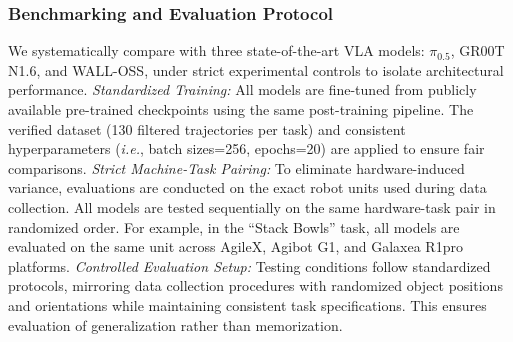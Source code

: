 \subsubsection{Benchmarking and Evaluation Protocol}
We systematically compare \method with three state-of-the-art VLA models: $\pi_{0.5}$, GR00T N1.6, and WALL-OSS, under strict experimental controls to isolate architectural performance.
\textit{Standardized Training:} 
All models are fine-tuned from publicly available pre-trained checkpoints using the same post-training pipeline. The verified dataset (130 filtered trajectories per task) and consistent hyperparameters (\textit{i.e.}, batch sizes=256, epochs=20) are applied to ensure fair comparisons.
\textit{Strict Machine-Task Pairing:} 
To eliminate hardware-induced variance, evaluations are conducted on the exact robot units used during data collection. All models are tested sequentially on the same hardware-task pair in randomized order. For example, in the ``Stack Bowls'' task, all models are evaluated on the same unit across AgileX, Agibot G1, and Galaxea R1pro platforms.
\textit{Controlled Evaluation Setup:} 
Testing conditions follow standardized protocols, mirroring data collection procedures with randomized object positions and orientations while maintaining consistent task specifications. This ensures evaluation of generalization rather than memorization.
